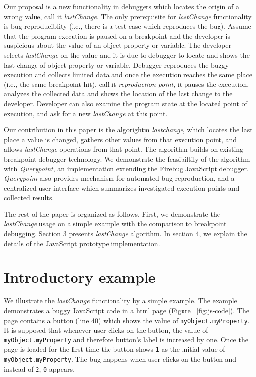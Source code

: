 \documentclass[preprint]{sigplanconf}
\begin{document}
Our proposal is a new functionality in debuggers which locates the origin of a wrong value, call it \textit{lastChange}. The only prerequisite for \textit{lastChange} functionality is bug reproduciblity (i.e., there is a test case which reproduces the bug). Assume that the program execution is paused on a breakpoint and the developer is suspicious about the value of an object property or variable. The developer selects \textit{lastChange} on the value and it is due to debugger to locate and shows the last change of object property or variable. Debugger reproduces the buggy execution and collects limited data and once the execution reaches the same place (i.e., the same breakpoint hit), call it \textit{reproduction point}, it pauses the execution, analyzes the collected data and shows the location of the last change to the developer. Developer can also examine the program state at the located point of execution, and ask for a new \textit{lastChange} at this point.

Our contribution in this paper is the algorightm \textit{lastchange}, which locates the last place a value is changed, gathers other values from that execution point, and allows \textit{lastChange} operations from that point. The algorithm builds on existing breakpoint debugger technology. We demonstrate the feasibiltily of the algorithm with \textit{Querypoint}, an implementation extending the Firebug JavaScript debugger. \textit{Querypoint} also provides mechanism for automated bug reproduction, and a centralized user interface which summarizes investigated execution points and collected results. 

The rest of the paper is organized as follows. First, we demonstrate the \textit{lastChange} usage on a simple example with the comparison to breakpoint debugging. Section 3 presents \textit{lastChange} algorithm. In section 4, we explain the details of the JavaScript prototype implementation. 

\section{Introductory example}
We illustrate the \textit{lastChange} functionality by a simple example. The example demonstrates a buggy JavaScript code in a html page (Figure ~\ref{fig:js-code}). The page contains a button (line 40) which shows the value of \texttt{myObject.myProperty}. It is supposed that whenever user clicks on the button, the value of \texttt{myObject.myProperty} and therefore button's label is increased by one. Once the page is loaded for the first time the button shows \texttt{1} as the initial value of \texttt{myObject.myProperty}. The bug happens when user clicks on the button and instead of \texttt{2}, \texttt{0} appears. 
\end{document}
